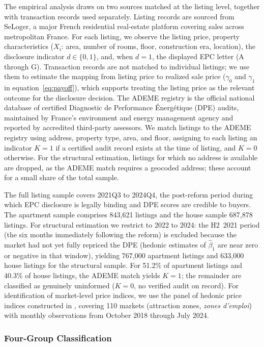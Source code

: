 The empirical analysis draws on two sources matched at the listing level, together with transaction records used separately. Listing records are sourced from SeLoger, a major French residential real-estate platform covering sales across metropolitan France. For each listing, we observe the listing price, property characteristics ($X_i$: area, number of rooms, floor, construction era, location), the disclosure indicator $d\in\{0,1\}$, and, when $d=1$, the displayed EPC letter (A through G). Transaction records are not matched to individual listings; we use them to estimate the mapping from listing price to realized sale price ($\gamma_0$ and $\gamma_1$ in equation~\eqref{eq:payoff}), which supports treating the listing price as the relevant outcome for the disclosure decision. The ADEME registry is the official national database of certified Diagnostic de Performance Énergétique (DPE) audits, maintained by France's environment and energy management agency and reported by accredited third-party assessors. We match listings to the ADEME registry using address, property type, area, and floor, assigning to each listing an indicator $K=1$ if a certified audit record exists at the time of listing, and $K=0$ otherwise. For the structural estimation, listings for which no address is available are dropped, as the ADEME match requires a geocoded address; these account for a small share of the total sample.

The full listing sample covers 2021Q3 to 2024Q4, the post-reform period during which EPC disclosure is legally binding and DPE scores are credible to buyers. The apartment sample comprises 843,621 listings and the house sample 687,878 listings. For structural estimation we restrict to 2022 to 2024: the H2~2021 period (the six months immediately following the reform) is excluded because the market had not yet fully repriced the DPE (hedonic estimates of $\hat\beta_1$ are near zero or negative in that window), yielding 767,000 apartment listings and 633,000 house listings for the structural sample. For 51.2\% of apartment listings and 40.3\% of house listings, the ADEME match yields $K=1$; the remainder are classified as genuinely uninformed ($K=0$, no verified audit on record). For identification of market-level price indices, we use the panel of hedonic price indices constructed in \citet{patras_mandatory_2024}, covering 110 markets (attraction zones, \textit{zones d'emploi}) with monthly observations from October 2018 through July 2024.

\subsubsection{Four-Group Classification}

